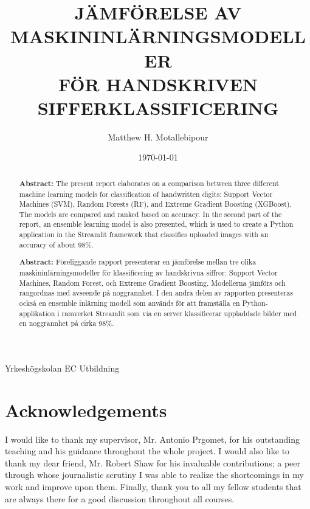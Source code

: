 \documentclass[12pt,a4paper]{article}
\title{\Huge{JÄMFÖRELSE AV\\MASKININLÄRNINGSMODELLER\\
FÖR HANDSKRIVEN SIFFERKLASSIFICERING}}
\author{Matthew H. Motallebipour}
\date{\today}
\newcommand{\institute}[1]{%
  \begin{center}
    \large{#1}
  \end{center}
}
\begin{document}
\maketitle
\institute{Yrkeshögskolan EC Utbildning}

\newpage

\begin{abstract}
    \noindent
    \textbf{Abstract:} The present report elaborates on a comparison between three different machine learning models for classification of handwritten digits: Support Vector Machines (SVM), Random Forests (RF), and Extreme Gradient Boosting (XGBoost). The models are compared and ranked based on accuracy. In the second part of the report, an ensemble learning model is also presented, which is used to create a Python application in the Streamlit framework that classifies uploaded images with an accuracy of about 98\%.
  \end{abstract}
  
\newpage

\begin{abstract}
    \noindent
    \textbf{Abstract:} Föreliggande rapport presenterar en jämförelse mellan tre olika maskininlärningsmodeller för klassificering av handskrivna siffror: Support Vector Machines, Random Forest, och Extreme Gradient Boosting. Modellerna jämförs och rangordnas med avseende på noggrannhet. I den andra delen av rapporten presenteras också en ensemble inlärning modell som används för att framställa en Python-applikation i ramverket Streamlit som via en server klassificerar uppladdade bilder med en noggrannhet på cirka 98\%.
  \end{abstract}

\newpage

\section*{Acknowledgements}
I would like to thank my supervisor, Mr. Antonio Prgomet, for his outstanding teaching and his guidance throughout the whole project. I would also like to thank my dear friend, Mr. Robert Shaw for his invaluable contributions; a peer through whose journalistic scrutiny I was able to realize the shortcomings in my work and improve upon them. Finally, thank you to all my fellow students that are always there for a good discussion throughout all courses.

\newpage

\end{document}
